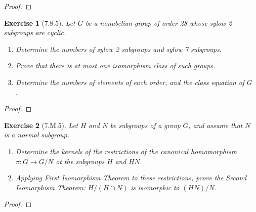 \documentclass[12pt]{article}
\newtheorem*{exer}{Exercise}
\begin{document}
\begin{proof}

\end{proof}


\begin{exer}[7.8.5]

    Let $G$ be a nonabelian group of order 28 whose sylow 2 subgroups
    are cyclic.

    \begin{enumerate}
        \item Determine the numbers of sylow 2 subgroups and sylow 7
            subgroups.

        \item Prove that there is at most one isomorphism class of such
            groups.

        \item Determine the numbers of elements of each order, and the
            class equation of $G$.
    \end{enumerate}

\end{exer}

\begin{proof}

\end{proof}


\begin{exer}[7.M.5]

    Let $H$ and $N$ be subgroups of a group $G$, and assume that $N$ is
    a normal subgroup.

    \begin{enumerate}
        \item Determine the kernels of the restrictions of the canonical
            homomorphism $\pi : G \rightarrow G/N$ ot the subgroups $H$
            and $HN$. 

        \item Applying First Isomorphism Theorem to these restrictions,
            prove the \textit{Second Isomorphism Theorem}: $H/(H \cap
            N)$ is isomorphic to $(HN)/N$. 
    \end{enumerate}

\end{exer}

\begin{proof}

\end{proof}
\end{document}
